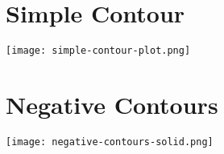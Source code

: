 \documentclass[11pt,a4paper]{article}
\begin{document}
\section{Simple Contour}

\texttt{[image: simple-contour-plot.png]}

\section{Negative Contours}

\texttt{[image: negative-contours-solid.png]}
\end{document}
